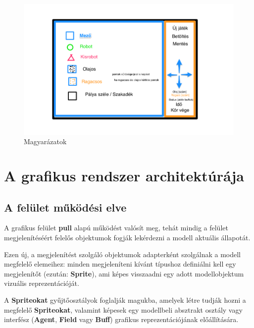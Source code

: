 \clearpage

\begin{figure}[h!]
\begin{center}
\includegraphics[width=17cm]{chapters/chapter11/3.png}
\caption{Magyarázatok}
\label{fig:Grafikus3}
\end{center}
\end{figure}

\section{A grafikus rendszer architektúrája}

\subsection{A felület működési elve}
\noindent A grafikus felület \textbf{pull} alapú működést valósít meg, tehát mindig a felület megjelenítéséért felelős objektumok fogják lekérdezni a modell aktuális állapotát. 

\noindent Ezen új, a megjelenítést szolgáló objektumok adapterként szolgálnak a modell megfelelő elemeihez: minden megjeleníteni kívánt típushoz definiálni kell egy megjelenítőt (ezután: \textbf{Sprite}), ami képes visszaadni egy adott modellobjektum vizuális reprezentációját. 

\noindent A \textbf{Spriteokat} gyűjtőosztályok
foglalják magukba, amelyek létre tudják hozni a megfelelő \textbf{Spriteokat}, valamint képesek egy modellbeli absztrakt osztály vagy interfész (\textbf{Agent}, \textbf{Field} vagy \textbf{Buff}) grafikus reprezentációjának előállítására. 

